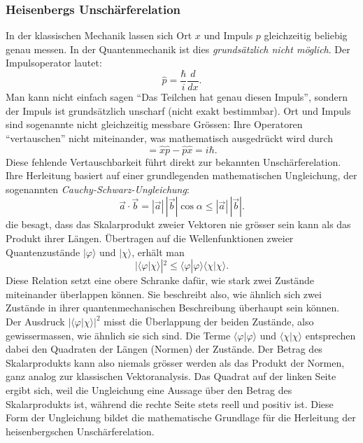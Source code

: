 \subsubsection{Heisenbergs Unschärferelation%
\label{fourier:subsubsection:unschaerferelation}}
%
%
In der klassischen Mechanik lassen sich Ort $x$ und Impuls $p$ gleichzeitig beliebig genau messen.
In der Quantenmechanik ist dies \emph{grundsätzlich nicht möglich}.
Der Impulsoperator lautet:
\begin{equation}
	\hat{p} = \frac{\hbar}{i} \frac{d}{dx}.
\end{equation}
Man kann nicht einfach sagen ``Das Teilchen hat genau diesen Impuls'', sondern der Impuls ist grundsätzlich unscharf (nicht exakt bestimmbar).
Ort und Impuls sind sogenannte nicht gleichzeitig messbare Grössen:
Ihre Operatoren ``vertauschen'' nicht miteinander, was mathematisch ausgedrückt wird durch
\begin{equation}
	[\hat{x},\hat{p}] = \hat{x} \hat{p} - \hat{p} \hat{x} = i \hbar.
\end{equation}
Diese fehlende Vertauschbarkeit führt direkt zur bekannten Unschärferelation.
Ihre Herleitung basiert auf einer grundlegenden mathematischen Ungleichung, der sogenannten \emph{Cauchy-Schwarz-Ungleichung}:
%
\begin{equation}\label{fourier:equation:CauchySchwarzUngleichung}
	\vec{a} \cdot \vec{b} = |\vec{a}|\, |\vec{b}|\cos\alpha \le |\vec{a}|\, |\vec{b}|.
\end{equation}
die besagt, dass das Skalarprodukt zweier Vektoren nie grösser sein kann als das Produkt ihrer Längen.
Übertragen auf die Wellenfunktionen zweier Quantenzustände $|\varphi\rangle$ und $|\chi\rangle$, erhält man
\begin{equation}
	|\langle\varphi | \chi\rangle|^2 \le \langle\varphi | \varphi\rangle \langle\chi | \chi\rangle.
\end{equation}
Diese Relation setzt eine obere Schranke dafür, wie stark zwei Zustände miteinander überlappen können.
Sie beschreibt also, wie ähnlich sich zwei Zustände in ihrer quantenmechanischen Beschreibung überhaupt sein können.
Der Ausdruck $|\langle\varphi|\chi\rangle|^2$ misst die Überlappung der beiden Zustände, also gewissermassen, wie ähnlich sie sich sind.
Die Terme $\langle\varphi|\varphi\rangle$ und $\langle\chi|\chi\rangle$ entsprechen dabei den Quadraten der Längen (Normen) der Zustände.
Der Betrag des Skalarprodukts kann also niemals grösser werden als das Produkt der Normen, ganz analog zur klassischen Vektoranalysis.
Das Quadrat auf der linken Seite ergibt sich, weil die Ungleichung eine Aussage über den Betrag des Skalarprodukts ist, während die rechte Seite stets reell und positiv ist.
Diese Form der Ungleichung bildet die mathematische Grundlage für die Herleitung der heisenbergschen Unschärferelation.

